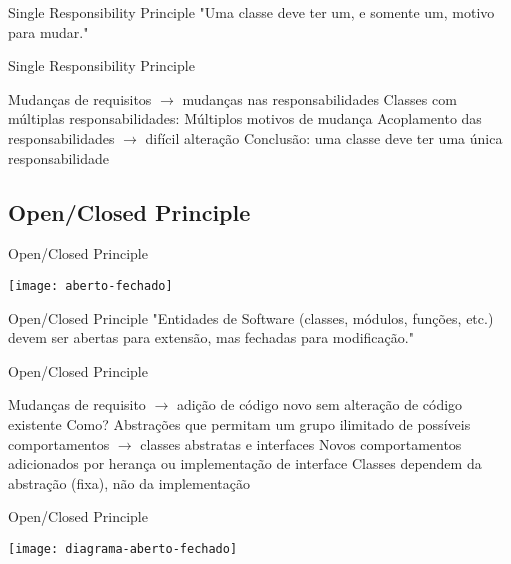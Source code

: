 \documentclass{beamer}
\begin{document}
\begin{frame}{Single Responsibility Principle}
 "Uma classe deve ter um, e somente um, motivo para mudar."
\end{frame}

\begin{frame}{Single Responsibility Principle}
 \begin{outline}
   Mudanças de requisitos $\rightarrow$ mudanças nas responsabilidades
   Classes com múltiplas responsabilidades:
     Múltiplos motivos de mudança
     Acoplamento das responsabilidades $\rightarrow$ difícil alteração
   Conclusão: uma classe deve ter uma \alert{única} responsabilidade
 \end{outline}
\end{frame}

\subsection{Open/Closed Principle}

\begin{frame}{Open/Closed Principle}
  \begin{center}
    \texttt{[image: aberto-fechado]}
  \end{center}
\end{frame}

\begin{frame}{Open/Closed Principle}
 "Entidades de Software (classes, módulos, funções, etc.) devem ser abertas para extensão, mas fechadas para modificação."
\end{frame}

\begin{frame}{Open/Closed Principle}
 \begin{outline}
  \1 
   Mudanças de requisito $\rightarrow$ adição de código novo sem alteração de código existente
   Como?
     Abstrações que permitam um grupo ilimitado de possíveis comportamentos $\rightarrow$ classes abstratas e interfaces
     Novos comportamentos adicionados por herança ou implementação de interface
     Classes dependem da abstração (fixa), não da implementação
 \end{outline}
\end{frame}

\begin{frame}{Open/Closed Principle}
  \begin{center}
    \texttt{[image: diagrama-aberto-fechado]}
  \end{center}
\end{frame}
\end{document}
